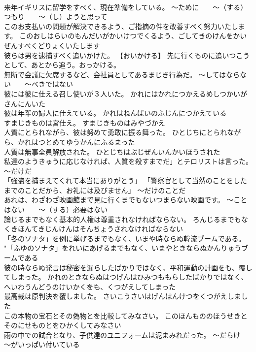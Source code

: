 \documentclass[8pt]{extreport}
\begin{document}
\begin{CJK}{UTF8}{min}
\\	来年イギリスに留学をすべく、現在準備をしている。	～ために　　～（する）つもり　　～（し）ようと思って
\\	このお支払いの問題が解決できるよう、ご指摘の件を改善すべく努力いたします。	このおしはらいのもんだいがかいけつでくるよう、ごしてきのけんをかいぜんすべくどりょくいたします 
\\	彼らは男を逮捕すべく追いかけた。	【おいかける】 先に行くものに追いつこうとして、あとから追う。おっかける。
\\	無断で会議に欠席するなど、会社員としてあるまじき行為だ。	～してはならない　　～べきではない
\\	彼には彼に仕える召し使いが３人いた。	かれにはかれにつかえるめしつかいがさんにんいた 
\\	彼は年輩の婦人に仕えている。	かれはねんぱいのふじんにつかえている 
\\	すまじきものは宮仕え。	すまじきものはみやづかえ 
\\	人質にとられながら、彼は努めて勇敢に振る舞った。	ひとじちにとられながら、かれはつとめてゆうかんにふるまった 
\\	人質は無事全員解放された。	ひとじちはぶじぜんいんかいほうされた 
\\	私達のようきゅうに応じなければ、人質を殺すまでだ」とテロリストは言った。	～だけだ
\\	「強盗を捕まえてくれて本当にありがとう」 「警察官として当然のことをしたまでのことだから、お礼には及びません」	～だけのことだ
\\	あれは、わざわざ映画館まで見に行くまでもないつまらない映画です。	～ことはない　　～（する）必要はない
\\	論じるまでもなく基本的人権は尊重されなければならない。	ろんじるまでもなくきほんてきじんけんはそんちょうされなければならない 
\\	「冬のソナタ」を例に挙げるまでもなく、いまや時ならぬ韓流ブームである。	"「ふゆのソナタ」をれいにあげるまでもなく、いまやときならぬかんりゅうブームである 
\\	彼の時ならぬ発言は秘密を漏らしたばかりではなく、平和運動の計画をも、覆してしまった。	かれのときならぬはつげんはひみつももらしたばかりではなく、へいわうんどうのけいかくをも、くつがえしてしまった 
\\	最高裁は原判決を覆しました。	さいこうさいはげんはんけつをくつがえしました 
\\	この本物の宝石とその偽物とを比較してみなさい。	このほんもののほうせきとそのにせものとをひかくしてみなさい 
\\	雨の中での試合となり、子供達のユニフォームは泥まみれだった。	～だらけ　　～がいっぱい付いている

\end{CJK}
\end{document}

